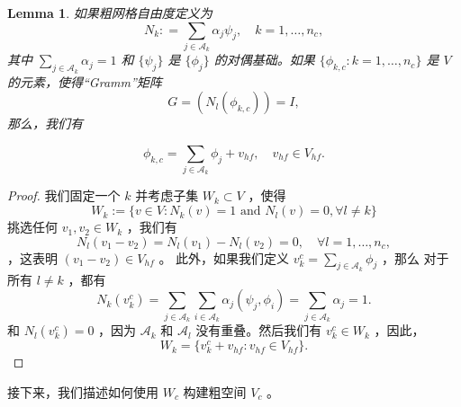 \documentclass[12pt]{acta_2011xz}
\newcommand{\dof}{\ensuremath{N}}
\newtheorem{lemma}[theorem]{Lemma}
\begin{document}
   \begin{lemma}如果粗网格自由度定义为
   \begin{equation*}
    \dof_k: = \sum_{j\in \mathcal A_k}\alpha_j\psi_j, \quad k=1, \dots, n_c,
\end{equation*}    其中    $\sum_{j\in \mathcal A_k}\alpha_j=1$    和    $ \{ \psi_j \} $    是    $ \{ \phi_j \} $    的对偶基础。如果    $ \{ \phi_{k,c}: k=1,\ldots, n_c \} $    是    $V$    的元素，使得“Gramm”矩阵
   \[ 
    G=(\dof_l(\phi_{k, c}))=I,
\]    那么，我们有

   \begin{equation}\label{Wcbasis}
    \phi_{k, c}=\sum_{j\in \mathcal A_k}\phi_j+v_{hf}, \quad v_{hf}\in V_{hf}.
\end{equation}     \end{lemma}    
   \begin{proof}我们固定一个    $k$    并考虑子集    $W_k\subset V$   ，使得 
   \begin{equation*}
        W_k:= \{ v\in V: N_k(v)=1 \text{ and } N_l(v)=0, \forall l\neq k \} 
    \end{equation*}    挑选任何    $v_1, v_2\in W_k$    ，我们有
   \begin{equation*}
        N_l(v_1-v_2)=N_l(v_1)-N_l(v_2)=0, \quad \forall l=1, \dots, n_c,
    \end{equation*}    ，这表明    $(v_1-v_2)\in V_{hf}$    。 
此外，如果我们定义    $v_k^c=\sum_{j\in \mathcal A_k}\phi_j$    ，那么
对于所有    $l\neq k$    ，都有    \begin{equation*}
        N_k(v_k^c)=\sum_{j\in\mathcal A_k}\sum_{i\in \mathcal A_k}\alpha_j (\psi_j, \phi_i)=\sum_{j\in \mathcal A_k}\alpha_j=1.
    \end{equation*}    和    $N_l(v_k^c)=0$    ，因为    $\mathcal A_k$    和    $\mathcal A_l$    没有重叠。然后我们有    $v_k^c\in W_k$    ，因此，
   \begin{equation*}
        W_k= \{ v_k^c+ v_{hf}: v_{hf}\in V_{hf} \} .
    \end{equation*}     \end{proof}     


 
 
 
 
 
 
 
 
 
 
 
 
 
   

接下来，我们描述如何使用    $W_c$    构建粗空间    $V_c$   。  
\end{document}
